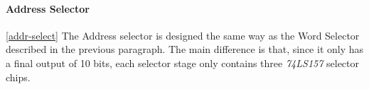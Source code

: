 

\paragraph{Address Selector} \ref{addr-select}
The Address selector is designed the same way as the Word Selector described in the previous paragraph. The main difference is that,
since it only has a final output of 10 bits, each selector stage only contains three \emph{74LS157} \cite{74ls157} selector chips.


